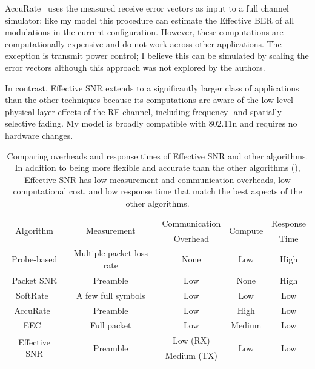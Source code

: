 AccuRate~\cite{Sen_AccuRate} uses the measured receive error vectors as input to a full channel simulator; like my model this procedure can estimate the Effective BER of all modulations in the current configuration. However, these computations are computationally expensive and do not work across other applications. The exception is transmit power control; I believe this can be simulated by scaling the error vectors although this approach was not explored by the authors.

In contrast, Effective SNR extends to a significantly larger class of applications than the other techniques because its computations are aware of the low-level physical-layer effects of the RF channel, including frequency- and spatially-selective fading. My model is broadly compatible with 802.11n and requires no hardware changes.

\begin{table}[ht]
\centering
\begin{tabular}{ccccc}
\toprule
\multirow{2}{*}{Algorithm} & \multirow{2}{*}{Measurement} & Communication & \multirow{2}{*}{Compute}  & Response  \\
& & Overhead &  & Time\\
\midrule
Probe-based & Multiple packet loss rate & None & Low & High \\
Packet SNR & Preamble & Low & None & High \\
SoftRate~\cite{Vutukuru_SoftRate} & A few full symbols & Low & Low & Low \\
AccuRate~\cite{Sen_AccuRate} & Preamble & Low & High & Low \\
EEC~\cite{Chen_EEC} & Full packet & Low & Medium & Low \\
\multirow{2}{*}{Effective SNR} & \multirow{2}{*}{Preamble} & Low (RX) & \multirow{2}{*}{Low} & \multirow{2}{*}{Low}\\
& & Medium (TX)\\
\bottomrule
\end{tabular}
\caption[Comparison of prediction algorithm overheads and response times]{\label{tab:algorithm_properties}Comparing overheads and response times of Effective SNR and other algorithms. In addition to being more flexible and accurate than the other algorithms (), Effective SNR has low measurement and communication overheads, low computational cost, and low response time that match the best aspects of the other algorithms.}
\end{table}

